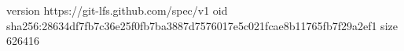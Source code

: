 version https://git-lfs.github.com/spec/v1
oid sha256:28634df7fb7c36e25f0fb7ba3887d7576017e5c021fcae8b11765fb7f29a2ef1
size 626416
